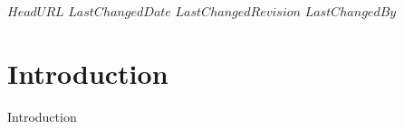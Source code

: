 \svnidlong
{$HeadURL$}
{$LastChangedDate$}
{$LastChangedRevision$}
{$LastChangedBy$}

\chapter{Introduction}

\begin{introduction}
Introduction 
\end{introduction}

